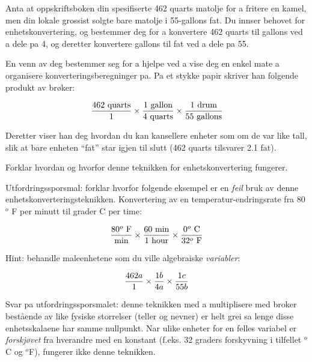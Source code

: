 

Anta at oppskriftsboken din spesifiserte 462 quarts matolje for a fritere en kamel, men din lokale grossist solgte bare matolje i 55-gallons fat.  Du innser behovet for enhetskonvertering, og bestemmer deg for a konvertere 462 quarts til gallons ved a dele pa 4, og deretter konvertere gallons til fat ved a dele pa 55.

En venn av deg bestemmer seg for a hjelpe ved a vise deg en enkel mate a organisere konverteringsberegninger pa.  Pa et stykke papir skriver han folgende produkt av brøker:

$${462 \hbox{ quarts} \over 1}  \times  {1 \hbox{ gallon} \over 4 \hbox{ quarts}}  \times  {1 \hbox{ drum} \over 55 \hbox{ gallons}}$$

Deretter viser han deg hvordan du kan kansellere enheter som om de var like tall, slik at bare enheten ``fat'' star igjen til slutt (462 quarts tilsvarer 2.1 fat).

Forklar hvordan og hvorfor denne teknikken for enhetskonvertering fungerer.

\vskip 10pt

Utfordringssporsmal: forklar hvorfor folgende eksempel er en {\it feil} bruk av denne enhetskonverteringsteknikken.  Konvertering av en temperatur-endringsrate fra 80$^{o}$ F per minutt til grader C per time:

$${80^{o} \hbox{ F} \over \hbox{min}} \times {60 \hbox{ min} \over 1 \hbox{ hour}} \times {0^{o} \hbox{ C} \over 32^{o} \hbox{ F}}$$







Hint: behandle maleenhetene som du ville algebraiske {\it variabler}:

$${462a \over 1}  \times  {1b \over 4a}  \times  {1c \over 55b}$$

\vskip 10pt

Svar pa utfordringssporsmalet: denne teknikken med a multiplisere med broker bestående av like fysiske storrelser (teller og nevner) er helt grei sa lenge disse enhetsskalaene har samme nullpunkt.  Nar ulike enheter for en felles variabel er {\it forskjøvet} fra hverandre med en konstant (f.eks. 32 graders forskyvning i tilfellet $^{o}$C og $^{o}$F), fungerer ikke denne teknikken.


